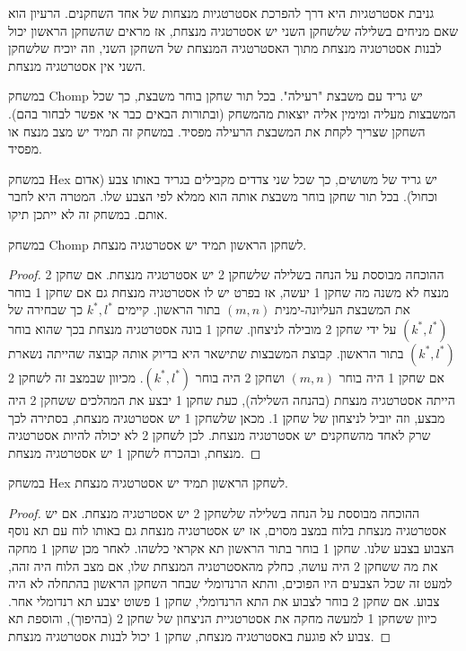 \documentclass{tstextbook}
\begin{document}
\begin{definition}
גניבת אסטרטגיות היא דרך להפרכת אסטרטגיות מנצחות של אחד השחקנים. הרעיון הוא שאם מניחים בשלילה שלשחקן השני יש אסטרטגיה מנצחת, אז מראים שהשחקן הראשון יכול לבנות אסטרטגיה מנצחת מתוך האסטרטגיה המנצחת של השחקן השני, וזה יוכיח שלשחקן השני אין אסטרטגיה מנצחת.

\end{definition}
\begin{example}[Chomp]
במשחק Chomp יש גריד עם משבצת "רעילה". בכל תור שחקן בוחר משבצת, כך שכל המשבצות מעליה ומימין אליה יוצאות מהמשחק (ובתורות הבאים כבר אי אפשר לבחור בהם). השחקן שצריך לקחת את המשבצת הרעילה מפסיד. במשחק זה תמיד יש מצב מנצח או מפסיד.

\end{example}
\begin{example}[Hex]
במשחק Hex יש גריד של משושים, כך שכל שני צדדים מקבילים בגריד באותו צבע (אדום וכחול). בכל תור שחקן בוחר משבצת אותה הוא ממלא לפי הצבע שלו. המטרה היא לחבר אותם. במשחק זה לא ייתכן תיקו.

\end{example}
\begin{proposition}
במשחק Chomp לשחקן הראשון תמיד יש אסטרטגיה מנצחת.

\end{proposition}
\begin{proof}
ההוכחה מבוססת על הנחה בשלילה שלשחקן 2 יש אסטרטגיה מנצחת. אם שחקן 2 מנצח לא משנה מה שחקן 1 יעשה, אז בפרט יש לו אסטרטגיה מנצחת גם אם שחקן 1 בוחר את המשבצת העליונה-ימנית \((m,n)\) בתור הראשון. קיימים \(k^*, l^*\) כך שבחירה של \((k^*, l^*)\) על ידי שחקן 2 מובילה לניצחון. שחקן 1 בונה אסטרטגיה מנצחת בכך שהוא בוחר \((k^*, l^*)\) בתור הראשון. קבוצת המשבצות שתישאר היא בדיוק אותה קבוצה שהייתה נשארת אם שחקן 1 היה בוחר \((m,n)\) ושחקן 2 היה בוחר \((k^*, l^*)\). מכיוון שבמצב זה לשחקן 2 הייתה אסטרטגיה מנצחת (בהנחה השלילה), כעת שחקן 1 יבצע את המהלכים ששחקן 2 היה מבצע, וזה יוביל לניצחון של שחקן 1. מכאן שלשחקן 1 יש אסטרטגיה מנצחת, בסתירה לכך שרק לאחד מהשחקנים יש אסטרטגיה מנצחת. לכן לשחקן 2 לא יכולה להיות אסטרטגיה מנצחת, ובהכרח לשחקן 1 יש אסטרטגיה מנצחת.

\end{proof}
\begin{proposition}
במשחק Hex לשחקן הראשון תמיד יש אסטרטגיה מנצחת.

\end{proposition}
\begin{proof}
ההוכחה מבוססת על הנחה בשלילה שלשחקן 2 יש אסטרטגיה מנצחת. אם יש אסטרטגיה מנצחת בלוח במצב מסוים, אז יש אסטרטגיה מנצחת גם באותו לוח עם תא נוסף הצבוע בצבע שלנו. שחקן 1 בוחר בתור הראשון תא אקראי כלשהו. לאחר מכן שחקן 1 מחקה את מה ששחקן 2 היה עושה, כחלק מהאסטרטגיה המנצחת שלו, אם מצב הלוח היה זהה, למעט זה שכל הצבעים היו הפוכים, והתא הרנדומלי שבחר השחקן הראשון בהתחלה לא היה צבוע. אם שחקן 2 בוחר לצבוע את התא הרנדומלי, שחקן 1 פשוט יצבע תא רנדומלי אחר. כיוון ששחקן 1 למעשה מחקה את אסטרטגיית הניצחון של שחקן 2 (בהיפוך), והוספת תא צבוע לא פוגעת באסטרטגיה מנצחת, שחקן 1 יכול לבנות אסטרטגיה מנצחת.

\end{proof}
\end{document}
